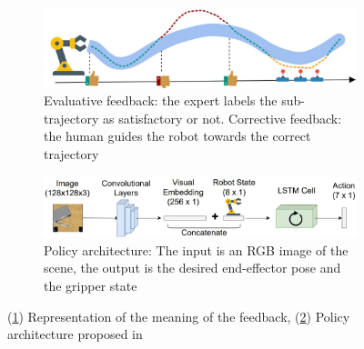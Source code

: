 \begin{figure}[htbp]
    \begin{subfigure}{0.45\textwidth}
         \includegraphics[width=\textwidth]{Figures/images/correct-me-if-i-am-wrong/feedback.jpg}
         \caption{Evaluative feedback: the expert labels the sub-trajectory as satisfactory or not. Corrective feedback: the human guides the robot towards the correct trajectory}
         \label{fig:feedback}
    \end{subfigure}
    \hfill
    \begin{subfigure}{0.50\textwidth}
         \includegraphics[width=\textwidth]{Figures/images/correct-me-if-i-am-wrong/correct_me_architecture.jpg}
         \caption{Policy architecture: The input is an RGB image of the scene, the output is the desired end-effector pose and the gripper state}
         \vspace{0.5cm}
         \label{fig:architecture}
    \end{subfigure}
    \caption{(\ref{fig:feedback}) Representation of the meaning of the feedback, (\ref{fig:architecture}) Policy architecture proposed in \cite{chisari2022correct}}
    \label{fig:correct_me_if_im_wrong}
\end{figure}
